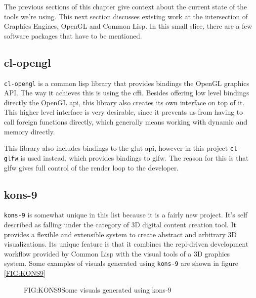 
\label{SEC:SOTA}

The previous sections of this chapter give context about the current state of the tools we're using.
This next section discusses existing work at the intersection of Graphics Engines, OpenGL and Common Lisp.
In this small slice,
there are a few software packages that have to be mentioned.

\subsection{cl-opengl}

\texttt{cl-opengl} is a common lisp library that provides bindings the OpenGL graphics API.
The way it achieves this is using the \ac{cffi}.
Besides offering low level bindings directly the OpenGL \ac{api},
this library also creates its own interface on top of it.
This higher level interface is very desirable,
since it prevents us from having to call foreign functions directly,
which generally means working with dynamic and memory directly\cite{cffi}.

This library also includes bindings to the \ac{glut} \ac{api},
however in this project \texttt{cl-glfw} is used instead,
which provides bindings to \ac{glfw}.
The reason for this is that \ac{glfw} gives full control of the render loop to the developer.

\subsection{kons-9}

\texttt{kons-9} is somewhat unique in this list because it is a fairly new project.
It's self described as falling under the category of 3D digital content creation tool.
It provides a flexible and extensible system to create abstract and arbitrary 3D visualizations.
Its unique feature is that it combines the \ac{repl}-driven development workflow provided by Common Lisp with the visual tools of a 3D graphics system.
Some examples of visuals generated using \texttt{kons-9} are shown in figure \ref{FIG:KONS9}

\begin{figure}[Kons-9 example]{FIG:KONS9}{Some visuals generated using kons-9}
\end{figure}

